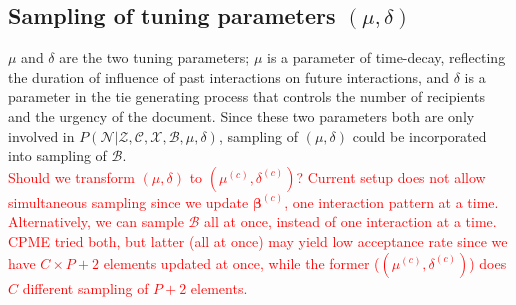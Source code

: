\documentclass[a4paper]{article}
\begin{document}
\subsection{Sampling of tuning parameters $(\mu, \delta)$}
$\mu$ and $\delta$ are the two tuning parameters; $\mu$ is a parameter of time-decay, reflecting the duration of influence of past interactions on future interactions, and $\delta$ is a parameter in the tie generating process that controls the number of recipients and the urgency of the document. Since these two parameters both are only involved in $P(\mathcal{N}| \mathcal{Z}, \mathcal{C}, \mathcal{X}, \mathcal{B}, \mu, \delta)$, sampling of $(\mu, \delta)$ could be incorporated into sampling of $\mathcal{B}$.\\\newline
\textcolor{red}{Should we transform $(\mu, \delta)$ to $(\mu^{(c)}, \delta^{(c)})$? Current setup does not allow simultaneous sampling since we update $\boldsymbol{\beta}^{(c)}$, one interaction pattern at a time. Alternatively, we can sample $\mathcal{B}$ all at once, instead of one interaction at a time. CPME tried both, but latter (all at once) may yield low acceptance rate since we have $C\times P+2$ elements updated at once, while the former ($(\mu^{(c)}, \delta^{(c)})$) does $C$ different sampling of $P+2$ elements.}
\newpage
\end{document}
